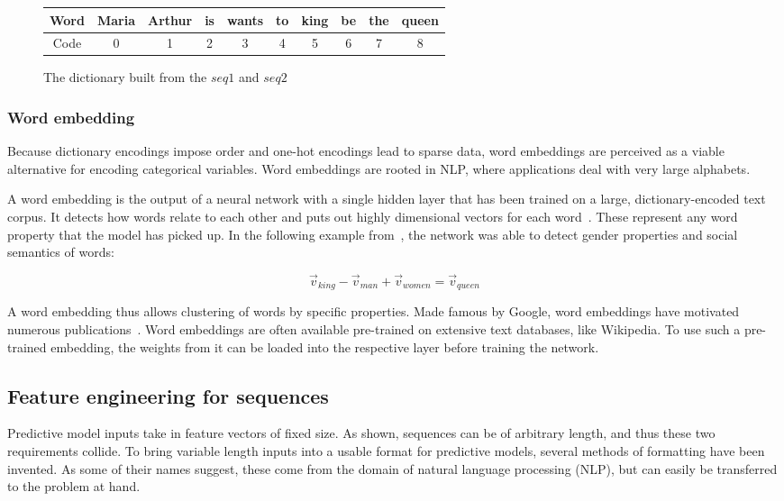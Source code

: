 \begin{figure}
    \centering
    \begin{tabular}{c|ccccccccc}
        Word & Maria & Arthur & is & wants & to & king & be & the & queen\\
        \midrule
        Code & 0 & 1 & 2 & 3 & 4 & 5 & 6 & 7 & 8
    \end{tabular}
    \caption{The dictionary built from the $seq1$ and $seq2$}
    \label{tab:dictionary-encoding}
\end{figure}

\subsubsection*{Word embedding}\label{sec:background:word-embedding}
Because dictionary encodings impose order and one-hot encodings lead to sparse data, word embeddings are perceived as a viable alternative for encoding categorical variables. Word embeddings are rooted in NLP, where applications deal with very large alphabets.

A word embedding is the output of a neural network with a single hidden layer that has been trained on a large, dictionary-encoded text corpus. It detects how words relate to each other and puts out highly dimensional vectors for each word~\cite{web:word-embedding}. These represent any word property that the model has picked up. In the following example from~\cite{mikolov2013distributed}, the network was able to detect gender properties and social semantics of words:

$$
\vec{v}_{king} - \vec{v}_{man} + \vec{v}_{women} = \vec{v}_{queen}
$$

A word embedding thus allows clustering of words by specific properties. Made famous by Google, word embeddings have motivated numerous publications~\cite{web:ahogrammer, goldberg2014word2vec}. Word embeddings are often available pre-trained on extensive text databases, like Wikipedia. To use such a pre-trained embedding, the weights from it can be loaded into the respective layer before training the network.

\subsection{Feature engineering for sequences}\label{sec:sequential-feature-engineering}
Predictive model inputs take in feature vectors of fixed size. As shown, sequences can be of arbitrary length, and thus these two requirements collide. To bring variable length inputs into a usable format for predictive models, several methods of formatting have been invented. As some of their names suggest, these come from the domain of natural language processing (NLP), but can easily be transferred to the problem at hand.

